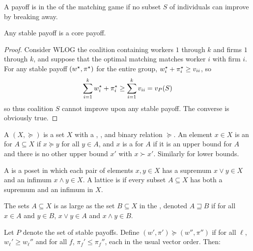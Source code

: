 \documentclass[10pt]{article}
\begin{document}
\begin{definition}
	A payoff is in the  of the matching game if no subset $S$ of individuals can improve by breaking away.
\end{definition}

\begin{theorem}
	Any stable payoff is a core payoff.
\end{theorem}
\begin{proof}
	Consider WLOG the coalition containing workers $1$ through $k$ and firms $1$ through $k$, and suppose that the optimal matching matches worker $i$ with firm $i$. For any stable payoff $(w^\star,\pi^\star)$  for the entire group, $w^\star_i + \pi^\star_i \ge v_{ii}$, so \[\sum_{i=1}^k w^\star_i + \pi_i^\star \ge \sum_{i=1}^k v_{ii} = v_P(S)\]so thus coalition $S$ cannot improve upon any stable payoff. The converse is obviously true.
\end{proof}

\begin{definition}
	A  $(X,\succeq)$ is a set $X$ with a , , and  binary relation $\succeq$. An element $x \in X$ is an  for $A \subseteq X$ if $x \succeq y$ for all $y \in A$, and $x$ is a  for $A$ if it is an upper bound for $A$ and there is no other upper bound $x'$ with $x \succ x'$. Similarly for lower bounds.
	
	A  is a poset in which each pair of elements $x,y \in X$ has a supremum $x \vee y \in X$ and an infimum $x \wedge y \in X$. A lattice is  if every subset $A \subseteq X$ has both a supremum and an infimum in $X$. 
	
	The sets $A \subseteq X$ is as large as the set $B \subseteq X$ in the , denoted $A \sqsupseteq B$ if for all $x \in A$ and $y \in B$, $x \vee y \in A$ and $x \wedge y \in B$.
\end{definition}

Let $P$ denote the set of stable payoffs. Define $(w',\pi') \succeq (w'',\pi'')$ if for all $\ell$, $w_\ell' \ge w_\ell''$ and for all $f$, $\pi_f' \le \pi_f''$, each in the usual vector order. Then:
\end{document}
